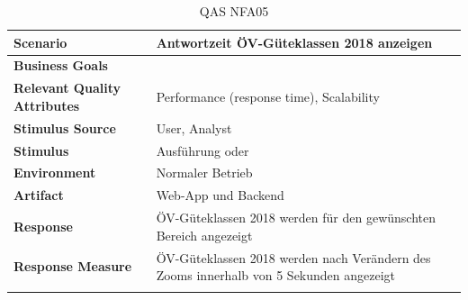 \begin{longtable}{l p{10.6cm}}
        \toprule
        \textbf{Scenario}
                                & Antwortzeit ÖV-Güteklassen 2018 anzeigen\\
        \midrule
        \textbf{Business Goals}
                                & \\
        \textbf{Relevant Quality Attributes}
                                & Performance (response time), Scalability\\
        \textbf{Stimulus Source}
                                & User, Analyst\\
        \textbf{Stimulus}
                                & Ausführung \nameref{Use Cases:UC06} oder \nameref{Use Cases:UC07}\\
        \textbf{Environment}
                                & Normaler Betrieb\\
        \textbf{Artifact}
                                & Web-App und Backend\\
        \textbf{Response}
                                & ÖV-Güteklassen 2018 werden für den gewünschten Bereich angezeigt\\  
        \textbf{Response Measure}
                                & ÖV-Güteklassen 2018 werden nach Verändern des Zooms innerhalb von 5 Sekunden angezeigt\\
        \bottomrule
    \caption{QAS NFA05}
    \label{table:nfa05}
\end{longtable}
